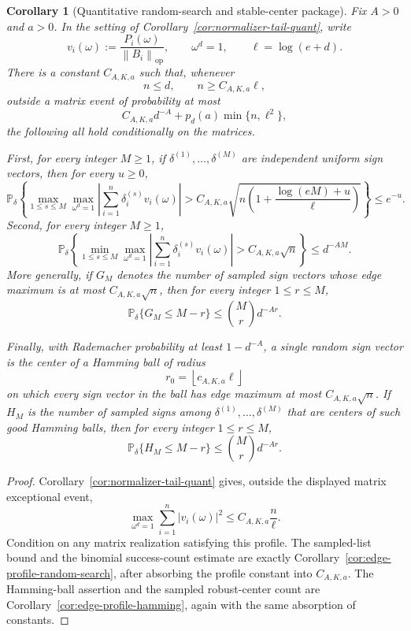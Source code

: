 \documentclass[11pt]{amsart}
\numberwithin{equation}{section}
\newtheorem{corollary}[theorem]{Corollary}
\theoremstyle{definition}
\theoremstyle{remark}
\newcommand{\op}{\mathrm{op}}
\newcommand{\Prob}{\mathbb P}
\newcommand{\norm}[1]{\left\lVert #1\right\rVert}
\begin{document}
\begin{corollary}[Quantitative random-search and stable-center package]
\label{cor:normalizer-tail-search-stability}
Fix \(A>0\) and \(a>0\).  In the setting of
Corollary~\ref{cor:normalizer-tail-quant}, write
\[
  v_i(\omega):=\frac{P_i(\omega)}{\norm{B_i}_{\op}},
  \qquad \omega^d=1,
  \qquad
  \ell=\log(e+d).
\]
There is a constant \(C_{A,K,a}\) such that, whenever
\[
  n\le d,\qquad n\ge C_{A,K,a}\ell,
\]
outside a matrix event of probability at most
\[
  C_{A,K,a}d^{-A}+p_d(a)\min\{n,\ell^2\},
\]
the following all hold conditionally on the matrices.

First, for every integer \(M\ge1\), if
\(\delta^{(1)},\ldots,\delta^{(M)}\) are independent uniform sign vectors, then
for every \(u\ge0\),
\[
  \Prob_\delta\left\{
  \max_{1\le s\le M}\max_{\omega^d=1}
  \left|\sum_{i=1}^n\delta_i^{(s)}v_i(\omega)\right|
  >
  C_{A,K,a}\sqrt{
    n\left(1+\frac{\log(eM)+u}{\ell}\right)}
  \right\}
  \le e^{-u}.
\]
Second, for every integer \(M\ge1\),
\[
  \Prob_\delta\left\{
  \min_{1\le s\le M}\max_{\omega^d=1}
  \left|\sum_{i=1}^n\delta_i^{(s)}v_i(\omega)\right|
  > C_{A,K,a}\sqrt n
  \right\}\le d^{-AM}.
\]
More generally, if \(G_M\) denotes the number of sampled sign vectors whose edge
maximum is at most \(C_{A,K,a}\sqrt n\), then for every integer \(1\le r\le M\),
\[
  \Prob_\delta\{G_M\le M-r\}\le \binom Mr d^{-Ar}.
\]

Finally, with Rademacher probability at least \(1-d^{-A}\), a single random sign
vector is the center of a Hamming ball of radius
\[
  r_0=\left\lfloor c_{A,K,a}\ell\right\rfloor
\]
on which every sign vector in the ball has edge maximum at most
\(C_{A,K,a}\sqrt n\).  If \(H_M\) is the number of sampled signs among
\(\delta^{(1)},\ldots,\delta^{(M)}\) that are centers of such good Hamming balls,
then for every integer \(1\le r\le M\),
\[
  \Prob_\delta\{H_M\le M-r\}\le \binom Mr d^{-Ar}.
\]
\end{corollary}

\begin{proof}
Corollary~\ref{cor:normalizer-tail-quant} gives, outside the displayed matrix
exceptional event,
\[
  \max_{\omega^d=1}\sum_{i=1}^n |v_i(\omega)|^2
  \le C_{A,K,a}\frac n\ell .
\]
Condition on any matrix realization satisfying this profile.  The sampled-list
bound and the binomial success-count estimate are exactly
Corollary~\ref{cor:edge-profile-random-search}, after absorbing the profile
constant into \(C_{A,K,a}\).  The Hamming-ball assertion and the sampled
robust-center count are Corollary~\ref{cor:edge-profile-hamming}, again with the
same absorption of constants.
\end{proof}
\end{document}
